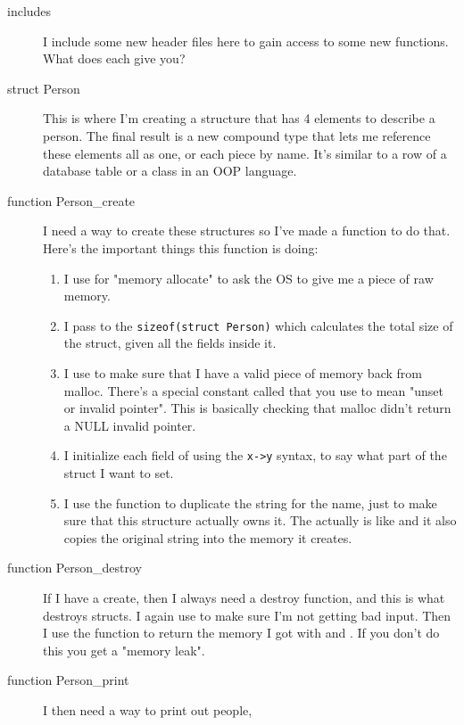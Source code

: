 \begin{description}
\item [includes] I include some new header files here to gain
    access to some new functions.  What does each give you?
\item [struct Person] This is where I'm creating a structure that
    has 4 elements to describe a person.  The final result is a
    new compound type that lets me reference these elements all
    as one, or each piece by name.  It's similar to a row of a database
    table or a class in an OOP language.
\item[function Person\_create] I need a way to create these structures
    so I've made a function to do that.  Here's the important 
    things this function is doing:
    \begin{enumerate}
    \item I use  for "memory allocate" to ask the OS
        to give me a piece of raw memory.
    \item I pass to  the \verb|sizeof(struct Person)| 
        which calculates the total size of the struct, given all the 
        fields inside it.
    \item I use  to make sure that I have a valid 
        piece of memory back from malloc.  There's a special constant called
     that you use to mean "unset or invalid pointer".  This
     is basically checking that malloc didn't return a
        NULL invalid pointer.
    \item I initialize each field of  using the
        \verb|x->y| syntax, to say what part of the struct I want to set.
    \item I use the  function to duplicate the string 
        for the name, just to make sure that this structure actually owns
        it.  The  actually is like  and it also
        copies the original string into the memory it creates.
    \end{enumerate}
\item[function Person\_destroy] If I have a create, then I always need
    a destroy function, and this is what destroys  structs.
    I again use  to make sure I'm not getting bad input.
    Then I use the function  to return the memory I got with
     and .  If you don't do this you get
    a "memory leak".
\item[function Person\_print] I then need a way to print out people,

\end{description}
